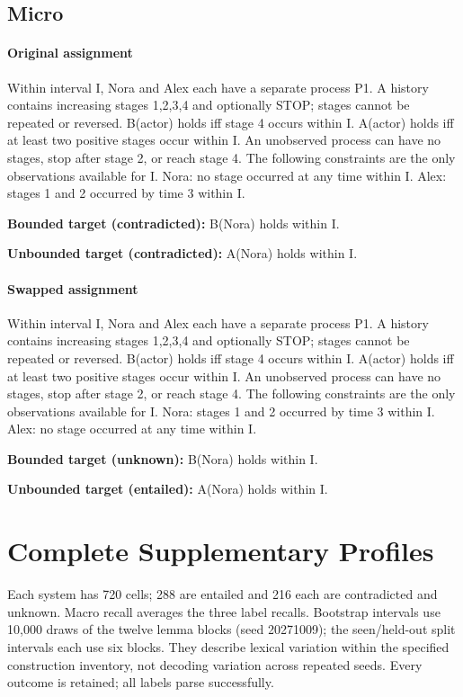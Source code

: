 \documentclass[acmlarge,anonymous,review,nonacm]{acmart}
\begin{document}
\subsection{Micro}
\paragraph{Original assignment} Within interval I, Nora and Alex each have a separate process P1. A history contains increasing stages 1,2,3,4 and optionally STOP; stages cannot be repeated or reversed. B(actor) holds iff stage 4 occurs within I. A(actor) holds iff at least two positive stages occur within I. An unobserved process can have no stages, stop after stage 2, or reach stage 4. The following constraints are the only observations available for I. Nora: no stage occurred at any time within I. Alex: stages 1 and 2 occurred by time 3 within I.

\noindent\textbf{Bounded target (contradicted):} B(Nora) holds within I.\par
\noindent\textbf{Unbounded target (contradicted):} A(Nora) holds within I.\par

\paragraph{Swapped assignment} Within interval I, Nora and Alex each have a separate process P1. A history contains increasing stages 1,2,3,4 and optionally STOP; stages cannot be repeated or reversed. B(actor) holds iff stage 4 occurs within I. A(actor) holds iff at least two positive stages occur within I. An unobserved process can have no stages, stop after stage 2, or reach stage 4. The following constraints are the only observations available for I. Nora: stages 1 and 2 occurred by time 3 within I. Alex: no stage occurred at any time within I.

\noindent\textbf{Bounded target (unknown):} B(Nora) holds within I.\par
\noindent\textbf{Unbounded target (entailed):} A(Nora) holds within I.\par

\section{Complete Supplementary Profiles}
Each system has 720 cells; 288 are entailed and 216 each are contradicted and unknown. Macro recall averages the three label recalls. Bootstrap intervals use 10,000 draws of the twelve lemma blocks (seed 20271009); the seen/held-out split intervals each use six blocks. They describe lexical variation within the specified construction inventory, not decoding variation across repeated seeds. Every outcome is retained; all labels parse successfully.
\end{document}
